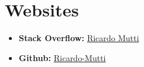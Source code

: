 \documentclass[10pt,a4paper,sans]{moderncv}
\begin{document}
\section{Websites}
\vspace{6pt}

\begin{itemize}

\item \textbf{Stack Overflow: }\href{https://stackoverflow.com/users/5848237/ricardo-mutti?tab=profile}{Ricardo Mutti}
\vspace{6pt}

\item \textbf{Github: }\href{https://github.com/Ricardo-Mutti}{Ricardo-Mutti}
\vspace{6pt}

\end{itemize}

\end{document}
